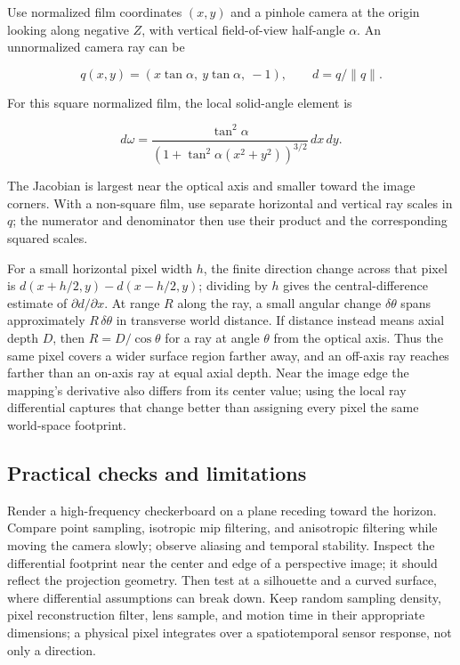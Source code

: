 Use normalized film coordinates \((x,y)\) and a pinhole camera at the origin looking along negative \(Z\), with vertical field-of-view half-angle \(\alpha\). An unnormalized camera ray can be

\[
q(x,y)=(x\tan\alpha,\ y\tan\alpha,\ -1),\qquad d=q/\|q\|.
\]

For this square normalized film, the local solid-angle element is

\[
d\omega=\frac{\tan^2\alpha}{\left(1+\tan^2\alpha(x^2+y^2)\right)^{3/2}}\,dx\,dy.
\]

The Jacobian is largest near the optical axis and smaller toward the image corners. With a non-square film, use separate horizontal and vertical ray scales in \(q\); the numerator and denominator then use their product and the corresponding squared scales.

For a small horizontal pixel width \(h\), the finite direction change across that pixel is \(d(x+h/2,y)-d(x-h/2,y)\); dividing by \(h\) gives the central-difference estimate of \(\partial d/\partial x\). At range \(R\) along the ray, a small angular change \(\delta\theta\) spans approximately \(R\,\delta\theta\) in transverse world distance. If distance instead means axial depth \(D\), then \(R=D/\cos\theta\) for a ray at angle \(\theta\) from the optical axis. Thus the same pixel covers a wider surface region farther away, and an off-axis ray reaches farther than an on-axis ray at equal axial depth. Near the image edge the mapping's derivative also differs from its center value; using the local ray differential captures that change better than assigning every pixel the same world-space footprint.

\subsection{Practical checks and limitations}\label{02-foundations-ii-ch036-practical-checks-and-limitations}

Render a high-frequency checkerboard on a plane receding toward the horizon. Compare point sampling, isotropic mip filtering, and anisotropic filtering while moving the camera slowly; observe aliasing and temporal stability. Inspect the differential footprint near the center and edge of a perspective image; it should reflect the projection geometry. Then test at a silhouette and a curved surface, where differential assumptions can break down. Keep random sampling density, pixel reconstruction filter, lens sample, and motion time in their appropriate dimensions; a physical pixel integrates over a spatiotemporal sensor response, not only a direction.


